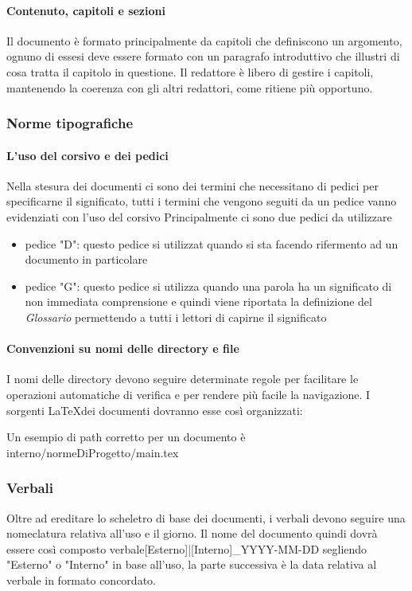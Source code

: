   \paragraph{Contenuto, capitoli e sezioni}
  Il documento è formato principalmente da capitoli che definiscono un argomento,
  ognuno di essesi deve essere formato con un paragrafo introduttivo che illustri
  di cosa tratta il capitolo in questione.
  Il redattore è libero di gestire i capitoli, mantenendo la coerenza con gli altri
  redattori, come ritiene più opportuno.
  \subsubsection{Norme tipografiche}
  \paragraph{L'uso del corsivo e dei pedici}
  Nella stesura dei documenti ci sono dei termini che necessitano di pedici per
  specificarne il significato, tutti i termini che vengono seguiti da un pedice
  vanno evidenziati con l'uso del corsivo
  Principalmente ci sono due pedici da utilizzare
    \begin{itemize}
      \item pedice "D": questo pedice si utilizzat quando si sta facendo rifermento
      ad un documento in particolare
      \item pedice "G": questo pedice si utilizza quando una parola ha un significato
      di non immediata comprensione e quindi viene riportata la definizione del
      \textit{Glossario}\doc
      permettendo a tutti i lettori di capirne il significato
    \end{itemize}

  \paragraph{Convenzioni su nomi delle directory e file}
  I nomi delle directory devono seguire determinate regole per facilitare le operazioni
  automatiche di verifica e per rendere più facile la navigazione.
  I sorgenti \LaTeX \space dei documenti dovranno esse così organizzati:


  Un esempio di path corretto per un documento è interno/normeDiProgetto/main.tex
  \subsubsection{Verbali}
  Oltre ad ereditare lo scheletro di base dei documenti, i verbali devono seguire
  una nomeclatura relativa all'uso e il giorno.
  Il nome del documento quindi dovrà essere così composto
  verbale[Esterno]|[Interno]_YYYY-MM-DD segliendo "Esterno" o "Interno" in base
  all'uso, la parte successiva è la data relativa al verbale in formato concordato.

